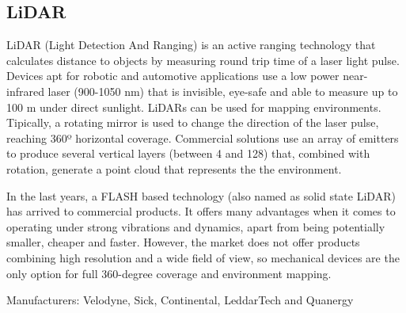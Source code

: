 \subsection{LiDAR}
LiDAR (Light Detection And Ranging) is an active ranging technology that calculates distance to objects by measuring round trip time of a laser light pulse.
Devices apt for robotic and automotive applications use a low power near-infrared laser (900-1050 nm) that is invisible, eye-safe and able to measure up to 100 m under direct sunlight.
LiDARs can be used for mapping environments. Tipically, a rotating mirror is used to change the direction of the laser pulse, reaching 360º horizontal coverage. Commercial solutions use an array of emitters to produce several vertical layers (between 4 and 128) that, combined with rotation, generate a point cloud that represents the the environment.

In the last years, a FLASH based technology (also named as solid state LiDAR) has arrived to commercial products. It offers many advantages when it comes to operating under strong vibrations and dynamics, apart from being potentially smaller, cheaper and faster.
However, the market does not offer products combining high resolution and a wide field of view, so mechanical devices are the only option for full 360-degree coverage and environment mapping.

Manufacturers: Velodyne, Sick, Continental, LeddarTech and Quanergy


%    




